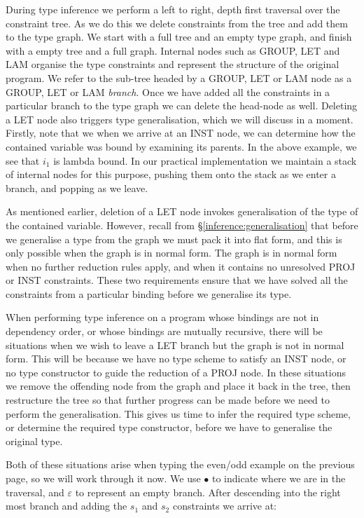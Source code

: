 During type inference we perform a left to right, depth first traversal over the constraint tree. As we do this we delete constraints from the tree and add them to the type graph.  We start with a full tree and an empty type graph, and finish with a empty tree and a full graph. Internal nodes such as GROUP, LET and LAM organise the type constraints and represent the structure of the original program. We refer to the sub-tree headed by a GROUP, LET or LAM node as a GROUP, LET or LAM \emph{branch}. Once we have added all the constraints in a particular branch to the type graph we can delete the head-node as well. Deleting a LET node also triggers type generalisation, which we will discuss in a moment. Firstly, note that we when we arrive at an INST node, we can determine how the contained variable was bound by examining its parents. In the above example, we see that $i_1$ is lambda bound. In our practical implementation we maintain a stack of internal nodes for this purpose, pushing them onto the stack as we enter a branch, and popping as we leave.

As mentioned earlier, deletion of a LET node invokes generalisation of the type of the contained variable. However, recall from \S\ref{inference:generalisation} that before we generalise a type from the graph we must pack it into flat form, and this is only possible when the graph is in normal form. The graph is in normal form when no further reduction rules apply, and when it contains no unresolved PROJ or INST constraints. These two requirements ensure that we have solved all the constraints from a particular binding before we generalise its type. 

When performing type inference on a program whose bindings are not in dependency order, or whose bindings are mutually recursive, there will be situations when we wish to leave a LET branch but the graph is not in normal form. This will be because we have no type scheme to satisfy an INST node, or no type constructor to guide the reduction of a PROJ node. In these situations we remove the offending node from the graph and place it back in the tree, then restructure the tree so that further progress can be made before we need to perform the generalisation. This gives us time to infer the required type scheme, or determine the required type constructor, before we have to generalise the original type.

Both of these situations arise when typing the even/odd example on the previous page, so we will work through it now. We use $\bullet$ to indicate where we are in the traversal, and $\varepsilon$ to represent an empty branch. After descending into the right most branch and adding the $s_1$ and $s_2$ constraints we arrive at:

